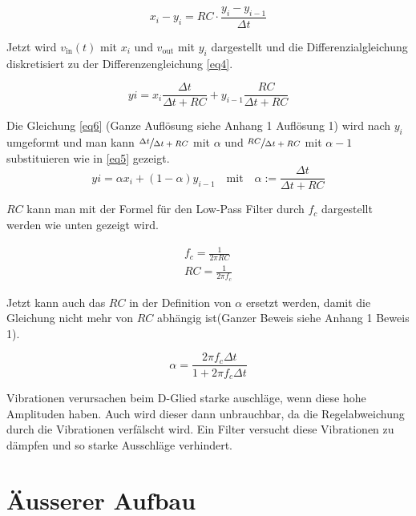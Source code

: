 \documentclass[12pt,a4paper, ngerman]{article}
\begin{document}
\begin{equation}\label{eq4}
x_{i}-y_{i}=RC\cdot \frac{y_{i}-y_{i-1}}{\Delta t}
\end{equation}

Jetzt wird $v_{\text{in}}(t)$ mit $x_{i}$ und $v_{\text{out}}$ mit $y_{i}$ dargestellt und die Differenzialgleichung diskretisiert zu der Differenzengleichung \ref{eq4}.

\begin{equation} \label{eq6}
y{i}=x_{i}\frac{\Delta t}{\Delta t+RC} + y_{i-1}\frac{RC}{\Delta t+RC}
\end{equation} 

Die Gleichung \ref{eq6} (Ganze Auflösung siehe Anhang 1 Auflösung 1) wird nach $y_{i}$ umgeformt und man kann $\sfrac{\Delta t}{\Delta t+RC}$  mit $\alpha$ und $\sfrac{RC}{\Delta t + RC}$ mit $\alpha-1$ substituieren wie in \ref{eq5} gezeigt.
\begin{equation}\label{eq5}
y{i}=\alpha x_{i} + (1-\alpha)y_{i-1} \quad \text{mit} \quad \alpha:=\frac{\Delta t}{\Delta t+RC}
\end{equation}

$RC$ kann man mit der Formel für den Low-Pass Filter durch $f_{c}$ dargestellt werden wie unten gezeigt wird.

\begin{align*}
f_{c} = \frac{1}{2\pi RC} \\
RC = \frac{1}{2\pi f_{c}} 
\end{align*}

Jetzt kann auch das $RC$ in der Definition von $\alpha$ ersetzt werden, damit die Gleichung nicht mehr von $RC$ abhängig ist(Ganzer Beweis siehe Anhang 1 Beweis 1).

\begin{equation*}
\alpha = \frac{2\pi f_{c}\Delta t}{1+2\pi f_{c}\Delta t} 
\end{equation*}


Vibrationen verursachen beim D-Glied starke auschläge, wenn diese hohe Amplituden haben. Auch wird dieser dann unbrauchbar, da die Regelabweichung durch die Vibrationen verfälscht wird. Ein Filter versucht diese Vibrationen zu dämpfen und so starke Ausschläge verhindert.
\newpage
\section{Äusserer Aufbau}
\end{document}
